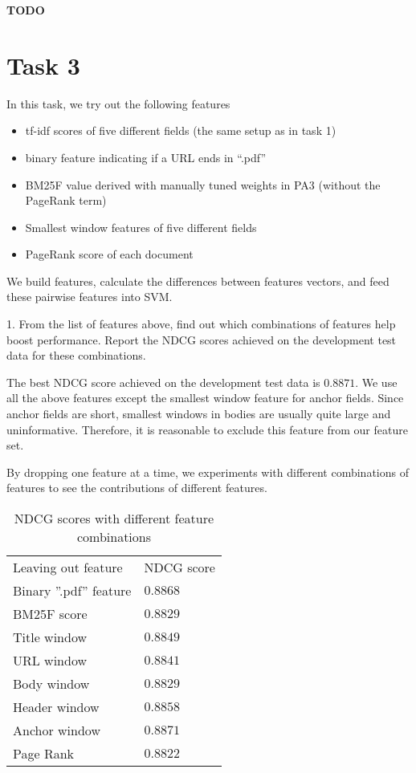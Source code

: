 \textbf{TODO}

\section{Task 3}
In this task, we try out the following features
\begin{itemize}
  \item[] tf-idf scores of five different fields (the same setup as in task 1)
  \item[] binary feature indicating if a URL ends in ``.pdf''
  \item[] BM25F value derived with manually tuned weights in PA3 (without the PageRank term)
  \item[] Smallest window features of five different fields
  \item[] PageRank score of each document
\end{itemize}
We build features, calculate the differences between features vectors, and feed these pairwise features into SVM.

1. From the list of features above, find out which combinations of features help boost
performance. Report the NDCG scores achieved on the development test data
for these combinations.

The best NDCG score achieved on the development test data is $0.8871$.
We use all the above features except the smallest window feature for anchor fields.
Since anchor fields are short, smallest windows in bodies are usually quite large and uninformative. Therefore, it is reasonable to exclude this feature from our feature set.

By dropping one feature at a time, we experiments with different combinations of features to see the contributions of different features.
\begin{table}
\begin{center}
\begin{tabular}{|l|l|}
  \hline
  Leaving out feature & NDCG score \\
  Binary ''.pdf'' feature & $0.8868$ \\
  BM25F score & $0.8829$ \\
  Title window & $0.8849$ \\
  URL window & $0.8841$ \\
  Body window & $0.8829$ \\
  Header window & $0.8858$ \\
  Anchor window & $\mathbf{0.8871}$ \\
  Page Rank & $0.8822$ \\
  \hline
\end{tabular}
\caption{NDCG scores with different feature combinations}\label{tab:perform}
\end{center}
\end{table}


